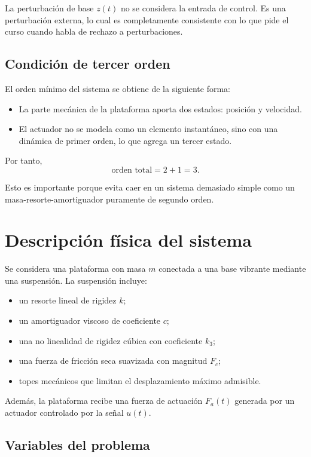 \documentclass[11pt]{article}
\begin{document}
La perturbaci\'on de base $z(t)$ no se considera la entrada de control. Es una perturbaci\'on externa, lo cual es completamente consistente con lo que pide el curso cuando habla de rechazo a perturbaciones.

\subsection{Condici\'on de tercer orden}

El orden m\'inimo del sistema se obtiene de la siguiente forma:

\begin{itemize}[leftmargin=1.2cm]
\item La parte mec\'anica de la plataforma aporta dos estados: posici\'on y velocidad.
\item El actuador no se modela como un elemento instant\'aneo, sino con una din\'amica de primer orden, lo que agrega un tercer estado.
\end{itemize}

Por tanto,
\[
\text{orden total} = 2 + 1 = 3.
\]

Esto es importante porque evita caer en un sistema demasiado simple como un masa-resorte-amortiguador puramente de segundo orden.

\section{Descripci\'on f\'isica del sistema}

Se considera una plataforma con masa $m$ conectada a una base vibrante mediante una suspensi\'on. La suspensi\'on incluye:

\begin{itemize}[leftmargin=1.2cm]
\item un resorte lineal de rigidez $k$;
\item un amortiguador viscoso de coeficiente $c$;
\item una no linealidad de rigidez c\'ubica con coeficiente $k_3$;
\item una fuerza de fricci\'on seca suavizada con magnitud $F_c$;
\item topes mec\'anicos que limitan el desplazamiento m\'aximo admisible.
\end{itemize}

Adem\'as, la plataforma recibe una fuerza de actuaci\'on $F_a(t)$ generada por un actuador controlado por la se\~nal $u(t)$.

\subsection{Variables del problema}
\end{document}
